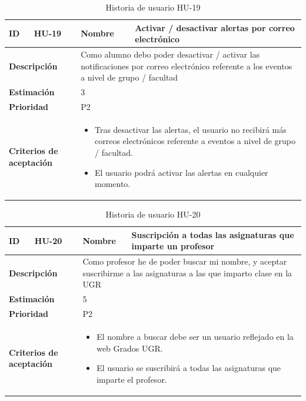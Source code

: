\begin{table}[H]
    \centering
    \begin{tabular}{|p{2cm}|p{4cm}|p{2cm}|p{4cm}|}
        \hline
        \textbf{ID} & HU-19 & \textbf{Nombre} & Activar / desactivar alertas por correo electrónico \\
        \hline
        \multicolumn{2}{|p{6cm}|}{\textbf{Descripción}} & \multicolumn{2}{p{6cm}|}{Como alumno debo poder desactivar / activar las notificaciones por correo electrónico referente a los eventos a nivel de grupo / facultad} \\
        \hline
        \multicolumn{2}{|p{6cm}|}{\textbf{Estimación}} & \multicolumn{2}{p{6cm}|}{3} \\
        \hline
        \multicolumn{2}{|p{6cm}|}{\textbf{Prioridad}} & \multicolumn{2}{p{6cm}|}{P2} \\
        \hline
        \multicolumn{2}{|p{6cm}|}{\textbf{Criterios de aceptación}} & \multicolumn{2}{p{6cm}|}{
            \begin{itemize}
                \item Tras desactivar las alertas, el usuario no recibirá más correos electrónicos referente a eventos a nivel de grupo / facultad.
                \item El usuario podrá activar las alertas en cualquier momento.
            \end{itemize}
        } \\
        \hline
    \end{tabular}
    \caption{Historia de usuario HU-19}
    \label{tab:hu_19}
\end{table}

\begin{table}[H]
    \centering
    \begin{tabular}{|p{2cm}|p{4cm}|p{2cm}|p{4cm}|}
        \hline
        \textbf{ID} & HU-20 & \textbf{Nombre} & Suscripción a todas las asignaturas que imparte un profesor \\
        \hline
        \multicolumn{2}{|p{6cm}|}{\textbf{Descripción}} & \multicolumn{2}{p{6cm}|}{Como profesor he de poder buscar mi nombre, y aceptar suscribirme a las asignaturas a las que imparto clase en la UGR} \\
        \hline
        \multicolumn{2}{|p{6cm}|}{\textbf{Estimación}} & \multicolumn{2}{p{6cm}|}{5} \\
        \hline
        \multicolumn{2}{|p{6cm}|}{\textbf{Prioridad}} & \multicolumn{2}{p{6cm}|}{P2} \\
        \hline
        \multicolumn{2}{|p{6cm}|}{\textbf{Criterios de aceptación}} & \multicolumn{2}{p{6cm}|}{
            \begin{itemize}
                \item El nombre a buscar debe ser un usuario reflejado en la web Grados UGR.
                \item El usuario se suscribirá a todas las asignaturas que imparte el profesor.
            \end{itemize}
        } \\
        \hline
    \end{tabular}
    \caption{Historia de usuario HU-20}
    \label{tab:hu_20}
\end{table}


